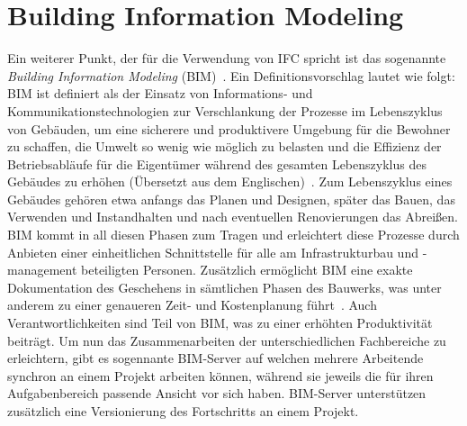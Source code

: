 \section{Building Information Modeling}\label{basics:bim}
Ein weiterer Punkt, der für die Verwendung von IFC spricht ist das sogenannte \textit{Building Information Modeling} (BIM)~\cite{Building41:online}.
Ein Definitionsvorschlag lautet wie folgt: \glqq{}BIM ist definiert als der Einsatz von Informations- und Kommunikationstechnologien zur Verschlankung der Prozesse im Lebenszyklus von Gebäuden, um eine sicherere und produktivere Umgebung für die Bewohner zu schaffen, die Umwelt so wenig wie möglich zu belasten und die Effizienz der Betriebsabläufe für die Eigentümer während des gesamten Lebenszyklus des Gebäudes zu erhöhen\grqq{} (Übersetzt aus dem Englischen)~\cite{Microsof51:online}.
Zum Lebenszyklus eines Gebäudes gehören etwa anfangs das Planen und Designen, später das Bauen, das Verwenden und Instandhalten und nach eventuellen Renovierungen das Abreißen.
BIM kommt in all diesen Phasen zum Tragen und erleichtert diese Prozesse durch Anbieten einer einheitlichen Schnittstelle für alle am Infrastrukturbau und -management beteiligten Personen.
Zusätzlich ermöglicht BIM eine exakte Dokumentation des Geschehens in sämtlichen Phasen des Bauwerks, was unter anderem zu einer genaueren Zeit- und Kostenplanung führt~\cite{Ding2014}.
Auch Verantwortlichkeiten sind Teil von BIM, was zu einer erhöhten Produktivität beiträgt.
Um nun das Zusammenarbeiten der unterschiedlichen Fachbereiche zu erleichtern, gibt es sogennante BIM-Server auf welchen mehrere Arbeitende synchron an einem Projekt arbeiten können, während sie jeweils die für ihren Aufgabenbereich passende Ansicht vor sich haben.
BIM-Server unterstützen zusätzlich eine Versionierung des Fortschritts an einem Projekt.


